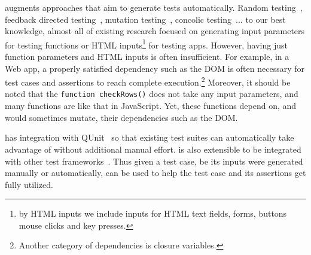 \tool augments approaches that aim to generate tests automatically.  
Random testing~\cite{}, feedback directed testing~\cite{}, mutation testing~\cite{}, concolic testing~\cite{}... to our best knowledge, almost all of existing research focused on generating input parameters for testing functions or HTML inputs\footnote{by HTML inputs we include inputs for HTML text fields, forms, buttons mouse clicks and key presses.} for testing apps.
However, having just function parameters and HTML inputs is often insufficient.  For example, in a Web app, a properly satisfied dependency such as the DOM is often necessary for test cases and assertions to reach complete execution.\footnote{Another category of dependencies is closure variables.}
Moreover, it should be noted that the {\tt function checkRows()} does not take any input parameters, and many functions are like that in JavaScript.
Yet, these functions depend on, and would sometimes mutate, their dependencies such as the DOM.

\tool has integration with QUnit~\cite{qunit} so that existing test suites can automatically take advantage of \tool without additional manual effort.  \tool is also extensible to be integrated with other test frameworks~\cite{jstests}.
Thus given a test case, be its inputs were generated manually or automatically, \tool can be used to help the test case and its assertions get fully utilized.

